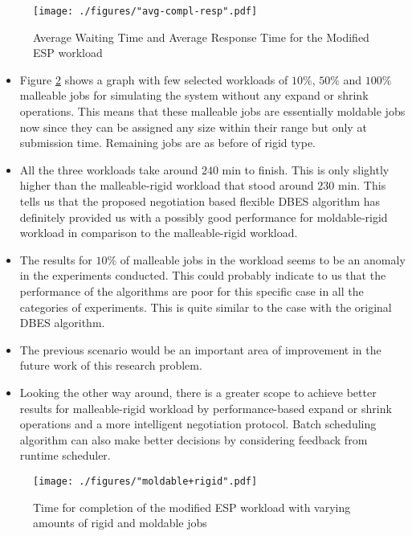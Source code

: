 \begin{figure}[!htbp]
\centering
\hspace*{-0.75in}
\texttt{[image: ./figures/"avg-compl-resp".pdf]}
\caption{Average Waiting Time and Average Response Time for the Modified ESP workload}
\label{fig:72}
\end{figure}
\begin{itemize}
\item Figure \ref{fig:73} shows a graph with few selected workloads of $10\%$, $50\%$ and $100\%$ malleable jobs for simulating the system without any expand or shrink operations. This means that these malleable jobs are essentially moldable jobs now since they can be assigned any size within their range but only at submission time. Remaining jobs are as before of rigid type.
\item All the three workloads take around $240$ min to finish. This is only slightly higher than the malleable-rigid workload that stood around $230$ min. This tells us that the proposed negotiation based flexible DBES algorithm has definitely provided us with a possibly good performance for moldable-rigid workload in comparison to the malleable-rigid workload.
\item The results for $10\%$ of malleable jobs in the workload seems to be an anomaly in the experiments conducted. This could probably indicate to us that the performance of the algorithms are poor for this specific case in all the categories of experiments. This is quite similar to the case with the original DBES algorithm. 
\item The previous scenario would be an important area of improvement in the future work of this research problem.
\item Looking the other way around, there is a greater scope to achieve better results for malleable-rigid workload by performance-based expand or shrink operations and a more intelligent negotiation protocol. Batch scheduling algorithm can also make better decisions by considering feedback from runtime scheduler.
\end{itemize}
\begin{figure}[!htbp]
\centering
\hspace*{-0.75in}
\texttt{[image: ./figures/"moldable+rigid".pdf]}
\caption{Time for completion of the modified ESP workload with varying amounts of rigid and moldable jobs}
\label{fig:73}
\end{figure}
